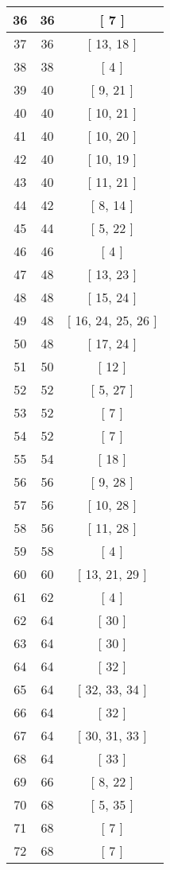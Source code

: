 \begin{center}
\begin{longtable}[H]{|| c c c ||}
36 & 36 & [ 7 ] \\ 
\hline
37 & 36 & [ 13, 18 ] \\ 
\hline
38 & 38 & [ 4 ] \\ 
\hline
39 & 40 & [ 9, 21 ] \\ 
\hline
40 & 40 & [ 10, 21 ] \\ 
\hline
41 & 40 & [ 10, 20 ] \\ 
\hline
42 & 40 & [ 10, 19 ] \\ 
\hline
43 & 40 & [ 11, 21 ] \\ 
\hline
44 & 42 & [ 8, 14 ] \\ 
\hline
45 & 44 & [ 5, 22 ] \\ 
\hline
46 & 46 & [ 4 ] \\ 
\hline
47 & 48 & [ 13, 23 ] \\ 
\hline
48 & 48 & [ 15, 24 ] \\ 
\hline
49 & 48 & [ 16, 24, 25, 26 ] \\ 
\hline
50 & 48 & [ 17, 24 ] \\ 
\hline
51 & 50 & [ 12 ] \\ 
\hline
52 & 52 & [ 5, 27 ] \\ 
\hline
53 & 52 & [ 7 ] \\ 
\hline
54 & 52 & [ 7 ] \\ 
\hline
55 & 54 & [ 18 ] \\ 
\hline
56 & 56 & [ 9, 28 ] \\ 
\hline
57 & 56 & [ 10, 28 ] \\ 
\hline
58 & 56 & [ 11, 28 ] \\ 
\hline
59 & 58 & [ 4 ] \\ 
\hline
60 & 60 & [ 13, 21, 29 ] \\ 
\hline
61 & 62 & [ 4 ] \\ 
\hline
62 & 64 & [ 30 ] \\ 
\hline
63 & 64 & [ 30 ] \\ 
\hline
64 & 64 & [ 32 ] \\ 
\hline
65 & 64 & [ 32, 33, 34 ] \\ 
\hline
66 & 64 & [ 32 ] \\ 
\hline
67 & 64 & [ 30, 31, 33 ] \\ 
\hline
68 & 64 & [ 33 ] \\ 
\hline
69 & 66 & [ 8, 22 ] \\ 
\hline
70 & 68 & [ 5, 35 ] \\ 
\hline
71 & 68 & [ 7 ] \\ 
\hline
72 & 68 & [ 7 ] \\ 
\hline

\end{longtable}
\end{center}
